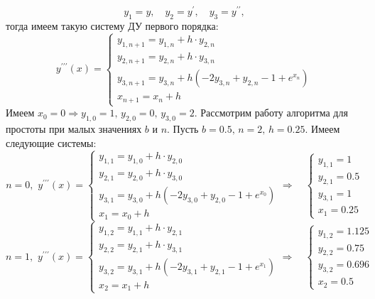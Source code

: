 \documentclass[a4paper]{article}
\begin{document}
$$y_1=y,\quad y_2=y^{\prime},\quad y_3=y^{\prime\prime},$$
тогда имеем такую систему ДУ первого порядка:
\begin{equation*}
    y^{\prime\prime\prime}(x)=
    \begin{cases}
        y_{1,n+1}=y_{1,n} + h \cdot y_{2,n} \\
        y_{2,n+1}=y_{2,n} + h \cdot y_{3,n} \\
        y_{3,n+1}=y_{3,n} + h(-2y_{3,n}+y_{2,n}-1+e^{x_n}) \\
        x_{n+1}=x_n + h
    \end{cases}
\end{equation*}
\noindent Имеем $x_0=0\Rightarrow y_{1,0}=1,\,y_{2,0}=0,\,y_{3,0}=2$.
Рассмотрим работу алгоритма для простоты при малых значениях $b$ и $n$.
Пусть $b=0.5,\,n=2,\,h=0.25$. Имеем следующие системы:
\begin{equation*}
    n=0,\,\,y^{\prime\prime\prime}(x)=
    \begin{cases}
        y_{1,1}=y_{1,0} + h \cdot y_{2,0} \\
        y_{2,1}=y_{2,0} + h \cdot y_{3,0} \\
        y_{3,1}=y_{3,0} + h(-2y_{3,0}+y_{2,0}-1+e^{x_0}) \\
        x_{1}=x_0 + h
    \end{cases}
    \Rightarrow\,\,\,\,\,\,
    \begin{cases}
        y_{1,1}=1 \\
        y_{2,1}=0.5 \\
        y_{3,1}=1 \\
        x_{1}=0.25
    \end{cases}
\end{equation*}
\begin{equation*}
    n=1,\,\,y^{\prime\prime\prime}(x)=
    \begin{cases}
        y_{1,2}=y_{1,1} + h \cdot y_{2,1} \\
        y_{2,2}=y_{2,1} + h \cdot y_{3,1} \\
        y_{3,2}=y_{3,1} + h(-2y_{3,1}+y_{2,1}-1+e^{x_1}) \\
        x_{2}=x_1 + h
    \end{cases}
    \Rightarrow\,\,\,\,\,\,
    \begin{cases}
        y_{1,2}=1.125 \\
        y_{2,2}=0.75 \\
        y_{3,2}=0.696 \\
        x_{2}=0.5
    \end{cases}
\end{equation*}
\end{document}

